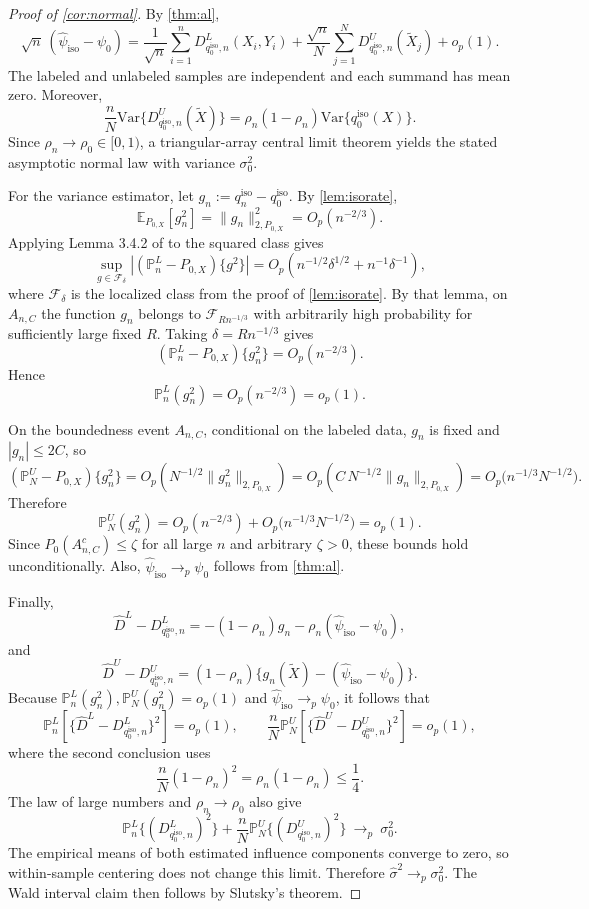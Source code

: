 \documentclass{article}
\theoremstyle{plain}
\theoremstyle{definition}
\newcommand{\E}{\mathbb{E}}
\newcommand{\Var}{\mathrm{Var}}
\newcommand{\1}{\mathbf{1}}
\newcommand{\rhozero}{\rho_0}
\newcommand{\rhon}{\rho_n}
\newcommand{\Pl}{\mathbb{P}^{L}_n}
\newcommand{\Pu}{\mathbb{P}^{U}_N}
\newcommand{\Px}{P_{0,X}}
\begin{document}
\begin{proof}[Proof of \cref{cor:normal}]
By \cref{thm:al},
\[
\sqrt n\,(\widehat{\psi}_{\mathrm{iso}}-\psi_0)
=
\frac{1}{\sqrt n}\sum_{i=1}^n D_{q_0^{\mathrm{iso}},n}^L(X_i,Y_i)
+
\frac{\sqrt n}{N}\sum_{j=1}^N D_{q_0^{\mathrm{iso}},n}^U(\widetilde X_j)
+
o_p(1).
\]
The labeled and unlabeled samples are independent and each summand has mean zero. Moreover,
\[
\frac{n}{N}\Var\{D_{q_0^{\mathrm{iso}},n}^U(\widetilde X)\}
=
\rhon(1-\rhon)\Var\{q_0^{\mathrm{iso}}(X)\}.
\]
Since \(\rhon\to\rhozero\in[0,1)\), a triangular-array central limit theorem yields the stated asymptotic normal law with variance \(\sigma_0^2\).

For the variance estimator, let \(g_n:=q_n^{\mathrm{iso}}-q_0^{\mathrm{iso}}\). By \cref{lem:isorate},
\[
\E_{\Px}[g_n^2]=\|g_n\|_{2,\Px}^2=O_p(n^{-2/3}).
\]
Applying Lemma 3.4.2 of \citet{vdvwellner1996} to the squared class gives
\[
\sup_{g\in\mathcal F_\delta}|(\Pl-\Px)\{g^2\}|
=O_p\!\left(n^{-1/2}\delta^{1/2}+n^{-1}\delta^{-1}\right),
\]
where \(\mathcal F_\delta\) is the localized class from the proof of \cref{lem:isorate}. By that lemma, on \(A_{n,C}\) the function \(g_n\) belongs to \(\mathcal F_{Rn^{-1/3}}\) with arbitrarily high probability for sufficiently large fixed \(R\). Taking \(\delta=Rn^{-1/3}\) gives
\[
(\Pl-\Px)\{g_n^2\}=O_p(n^{-2/3}).
\]
Hence
\[
\Pl(g_n^2)=O_p(n^{-2/3})=o_p(1).
\]

On the boundedness event \(A_{n,C}\), conditional on the labeled data, \(g_n\) is fixed and \(|g_n|\le 2C\), so
\[
(\Pu-\Px)\{g_n^2\}
=
O_p\left(N^{-1/2}\|g_n^2\|_{2,\Px}\right)
=
O_p\left(C\,N^{-1/2}\|g_n\|_{2,\Px}\right)
=
O_p\bigl(n^{-1/3}N^{-1/2}\bigr).
\]
Therefore
\[
\Pu(g_n^2)=O_p(n^{-2/3})+O_p\bigl(n^{-1/3}N^{-1/2}\bigr)=o_p(1).
\]
Since \(P_0(A_{n,C}^c)\le \zeta\) for all large \(n\) and arbitrary \(\zeta>0\), these bounds hold unconditionally. Also, \(\widehat{\psi}_{\mathrm{iso}}\to_p\psi_0\) follows from \cref{thm:al}.

Finally,
\[
\widehat D^L-D_{q_0^{\mathrm{iso}},n}^L
=
-(1-\rhon)g_n-\rhon(\widehat{\psi}_{\mathrm{iso}}-\psi_0),
\]
and
\[
\widehat D^U-D_{q_0^{\mathrm{iso}},n}^U
=
(1-\rhon)\{g_n(\widetilde X)-(\widehat{\psi}_{\mathrm{iso}}-\psi_0)\}.
\]
Because \(\Pl(g_n^2),\Pu(g_n^2)=o_p(1)\) and \(\widehat{\psi}_{\mathrm{iso}}\to_p\psi_0\), it follows that
\[
\Pl\!\left[\{\widehat D^L-D_{q_0^{\mathrm{iso}},n}^L\}^2\right]=o_p(1),
\qquad
\frac{n}{N}\Pu\!\left[\{\widehat D^U-D_{q_0^{\mathrm{iso}},n}^U\}^2\right]=o_p(1),
\]
where the second conclusion uses
\[
\frac{n}{N}(1-\rhon)^2=\rhon(1-\rhon)\le \frac14.
\]
The law of large numbers and \(\rhon\to\rhozero\) also give
\[
\Pl\{(D_{q_0^{\mathrm{iso}},n}^L)^2\}
+
\frac{n}{N}\Pu\{(D_{q_0^{\mathrm{iso}},n}^U)^2\}
\ \to_p\ \sigma_0^2.
\]
The empirical means of both estimated influence components converge to zero,
so within-sample centering does not change this limit.
Therefore \(\widehat\sigma^2\to_p \sigma_0^2\). The Wald interval claim then follows by Slutsky's theorem.
\end{proof}
\end{document}
